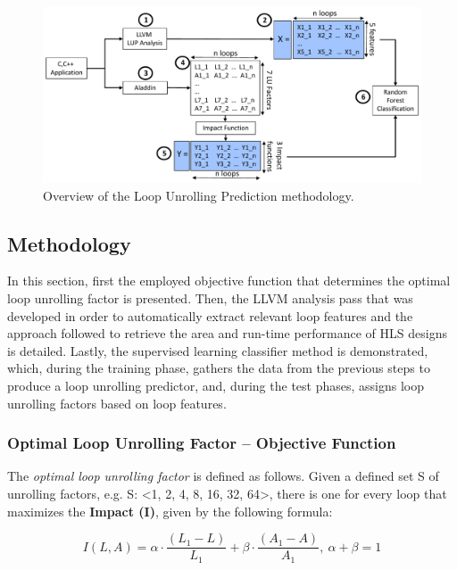 \documentclass[]{usiinfthesis}
\begin{document}
\begin{figure}[h!]
\centering
\includegraphics[width= 1 \linewidth]{figs/LUP_method}
\caption{Overview of the Loop Unrolling Prediction methodology.}
\label{fig:lup_method}
\end{figure}

\subsection{Methodology}
\label{sec:ml_meth}

In this section, first the employed objective function that determines the optimal loop 
unrolling factor is presented.
Then, the LLVM analysis pass that was developed in order to 
automatically extract relevant loop features and the approach followed to retrieve the 
area and run-time performance of HLS designs is detailed. Lastly, the supervised learning 
classifier method is demonstrated, which, during the training phase, gathers the data from the 
previous steps to produce a loop unrolling predictor, and, during the test phases, assigns 
loop unrolling factors based on loop features.\par

\subsubsection{Optimal Loop Unrolling Factor -- Objective Function}

The {\em optimal loop unrolling factor} is defined as follows.
Given a defined set S of unrolling factors, e.g. S: <1, 2, 4, 8, 16, 32, 64>, there is one for every
loop that maximizes the \textbf {Impact (I)}, given by the following formula:

$$I(L,A)= \alpha  \cdot \dfrac{ (L_1 - L)} {L_1} + \beta \cdot \dfrac{ (A_1 - A)} {A_1},\ \alpha + \beta = 1$$
\end{document}
